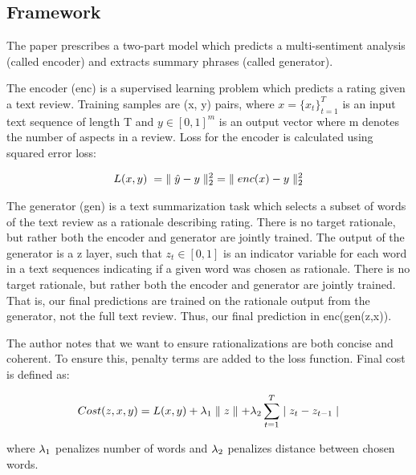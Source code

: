 \documentclass{article} %
\begin{document}
\subsection{Framework}

The paper prescribes a two-part model which predicts a multi-sentiment analysis
(called encoder) and extracts summary phrases (called generator).

The encoder (enc) is a supervised learning problem which predicts a rating given
a text review. Training samples are (x, y) pairs,  where $x = \{x_t\}_{t=1}^T$
is an input text sequence of length T and $y \in [0, 1]^m$ is an output vector
where m denotes the number of aspects in a review. Loss for the encoder is
calculated using squared error loss:

\begin{gather}
L(x,y)\hspace{1mm} = 
\hspace{1mm}\parallel\hat{y} - y\parallel _2^2  \hspace{1mm} = 
\hspace{1mm}\parallel enc(x) - y\parallel _2^2
\end{gather}

The generator (gen) is a text summarization task which selects a subset of words
of the text review as a rationale describing rating. There is no target
rationale, but rather both the encoder and generator are jointly trained. The
output of the generator is a z layer, such that $z_t \in [0, 1]$ is an indicator
variable for each word in a text sequences indicating if a given word was chosen
as rationale. There is no target rationale, but rather both the encoder and
generator are jointly trained. That is, our final predictions are trained on the
rationale output from the generator, not the full text review. Thus, our final
prediction in enc(gen(z,x)).

The author notes that we want to ensure rationalizations are both concise and
coherent. To ensure this, penalty terms are added to the loss function. Final
cost is defined as:

\begin{gather}
Cost(z,x,y) = 
L(x,y) + \lambda \textsubscript{1} \parallel z \parallel + 
\lambda \textsubscript{2} \sum_{t = 1}^{T}  \mid z_t - z_{t-1} \mid
\end{gather}

where $\lambda \textsubscript{1}$ penalizes number of words and $\lambda
\textsubscript{2}$ penalizes distance between chosen words.
\end{document}
